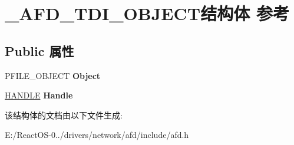 \hypertarget{struct___a_f_d___t_d_i___o_b_j_e_c_t}{}\section{\+\_\+\+A\+F\+D\+\_\+\+T\+D\+I\+\_\+\+O\+B\+J\+E\+C\+T结构体 参考}
\label{struct___a_f_d___t_d_i___o_b_j_e_c_t}
\subsection*{Public 属性}
\begin{DoxyCompactItemize}
\item 
\mbox{\label{struct___a_f_d___t_d_i___o_b_j_e_c_t_abedd422d00a806ec3efc4f23326bf12e}} 
P\+F\+I\+L\+E\+\_\+\+O\+B\+J\+E\+CT {\bfseries Object}
\item 
\mbox{\label{struct___a_f_d___t_d_i___o_b_j_e_c_t_a5c781389793eea8e492d0fd8edc5db8e}} 
\hyperlink{interfacevoid}{H\+A\+N\+D\+LE} {\bfseries Handle}
\end{DoxyCompactItemize}


该结构体的文档由以下文件生成\+:\begin{DoxyCompactItemize}
\item 
E\+:/\+React\+O\+S-\/0../drivers/network/afd/include/afd.\+h\end{DoxyCompactItemize}
